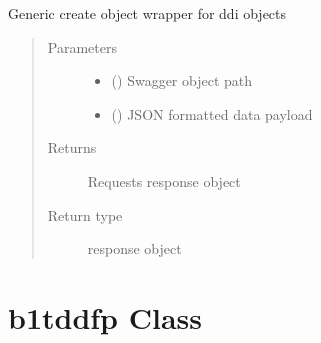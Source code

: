 \documentclass[letterpaper,10pt,english]{sphinxmanual}
\begin{document}
\begin{fulllineitems}

\begin{fulllineitems}
\label{\detokenize{b1tdep-class:bloxone.b1tdep.update}}
\sphinxAtStartPar
Generic create object wrapper for ddi objects
\begin{quote}\begin{description}
\item[{Parameters}] \leavevmode\begin{itemize}
\item {} 
\sphinxAtStartPar
{} () \textendash{} Swagger object path

\item {} 
\sphinxAtStartPar
{} () \textendash{} JSON formatted data payload

\end{itemize}

\item[{Returns}] \leavevmode
\sphinxAtStartPar
Requests response object

\item[{Return type}] \leavevmode
\sphinxAtStartPar
response object

\end{description}\end{quote}

\end{fulllineitems}


\end{fulllineitems}



\section{b1tddfp Class}
\label{\detokenize{b1tddfp-class:b1tddfp-class}}\label{\detokenize{b1tddfp-class::doc}}
\end{document}
